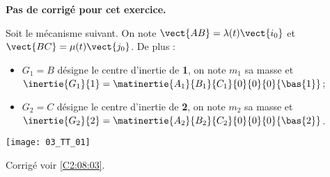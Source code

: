 \normaltrue
\correctionfalse



\setcounter{numques}{0}
\ifcorrection
\else
\textbf{Pas de corrigé pour cet exercice.}
\fi

\ifprof
\else
Soit le mécanisme suivant. On note $\vect{AB}=\lambda(t)\vect{i_0}$ et $\vect{BC}=\mu(t)\vect{j_0}$. De plus :
\begin{itemize}
\item $G_1 = B$ désigne le centre d'inertie de \textbf{1}, on note $m_1$ sa masse et $\inertie{G_1}{1}=\matinertie{A_1}{B_1}{C_1}{0}{0}{0}{\bas{1}}$; 
\item $G_2 = C$ désigne le centre d'inertie de \textbf{2}, on note $m_2$ sa masse et $\inertie{G_2}{2}=\matinertie{A_2}{B_2}{C_2}{0}{0}{0}{\bas{2}}$.
\end{itemize}
\begin{center}
\texttt{[image: 03\_TT\_01]}
\end{center}
\fi

\ifprof
\else
\fi

\ifprof
\else
\fi

\ifprof
\else
\fi

\ifprof
\else
\begin{flushright}
\footnotesize{Corrigé  voir \ref{C2:08:03}.}
\end{flushright}%
\fi